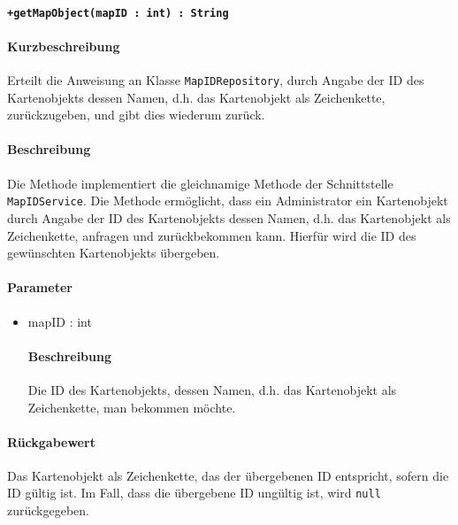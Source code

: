 \paragraph*{\texttt{+getMapObject(mapID : int) : String}}%
\paragraph*{Kurzbeschreibung}
Erteilt die Anweisung an Klasse \texttt{MapIDRepository}, durch Angabe der ID des Kartenobjekts dessen Namen, d.h. das Kartenobjekt als Zeichenkette, zurückzugeben, und gibt dies wiederum zurück.
\paragraph*{Beschreibung}
Die Methode implementiert die gleichnamige Methode der Schnittstelle \texttt{MapIDService}.
Die Methode ermöglicht, dass ein Administrator ein Kartenobjekt durch Angabe der ID des Kartenobjekts dessen Namen, d.h. das Kartenobjekt als Zeichenkette, anfragen und zurückbekommen kann.
Hierfür wird die ID des gewünschten Kartenobjekts übergeben.
\paragraph*{Parameter}
\begin{itemize}
    \item mapID : int
    		\paragraph*{Beschreibung}
    		Die ID des Kartenobjekts, dessen Namen, d.h. das Kartenobjekt als Zeichenkette, man bekommen möchte.
\end{itemize}
\paragraph*{Rückgabewert}
Das Kartenobjekt als Zeichenkette, das der übergebenen ID entspricht, sofern die ID gültig ist.
Im Fall, dass die übergebene ID ungültig ist, wird \texttt{null} zurückgegeben.
